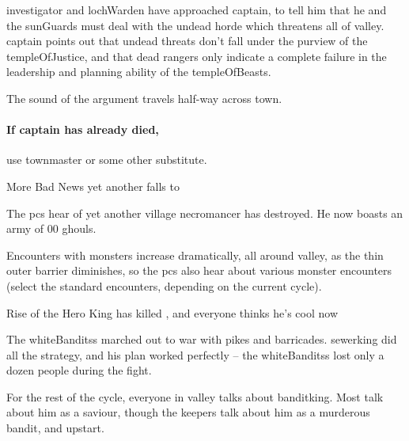 \Gls{investigator} and \gls{lochWarden} have approached \gls{captain}, to tell him that he and the \glspl{sunGuard} must deal with the undead horde which threatens all of \gls{valley}.
\Gls{captain} points out that undead threats don't fall under the purview of the \gls{templeOfJustice}, and that dead \glspl{ranger} only indicate a complete failure in the leadership and planning ability of the \gls{templeOfBeasts}.

The sound of the argument travels half-way across \gls{town}.

\paragraph{If \gls{captain} has already died,}
use \gls{townmaster} or some other substitute.

{More Bad News}%
{yet another  falls to }%

The \glspl{pc} hear of yet another \gls{village} \gls{necromancer} has destroyed.
He now boasts an army of 00 ghouls.

Encounters with \glspl{monster} increase dramatically, all around \gls{valley}, as the thin outer barrier diminishes,%
so the \glspl{pc} also hear about various \gls{monster} encounters (select the standard encounters, depending on the current \gls{cycle}).

{Rise of the Hero King}%
{ has killed , and everyone thinks he's cool now}%

The \glspl{whiteBandits} marched out to war with pikes and barricades.
\Gls{sewerking} did all the strategy, and his plan worked perfectly -- the \glspl{whiteBandits} lost only a dozen people during the fight.

For the rest of the \gls{cycle}, everyone in \gls{valley} talks about \gls{banditking}.
Most talk about him as a saviour, though the \glspl{keeper} talk about him as a murderous bandit, and upstart.
